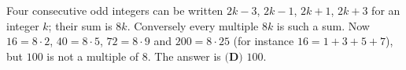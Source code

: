 Four consecutive odd integers can be written $2k-3$, $2k-1$, $2k+1$, $2k+3$ for an integer $k$; their sum is $8k$. Conversely every multiple $8k$ is such a sum. Now $16=8\cdot2$, $40=8\cdot5$, $72=8\cdot9$ and $200=8\cdot25$ (for instance $16=1+3+5+7$), but $100$ is not a multiple of $8$. The answer is $\boxed{\textbf{(D) }100}$.
